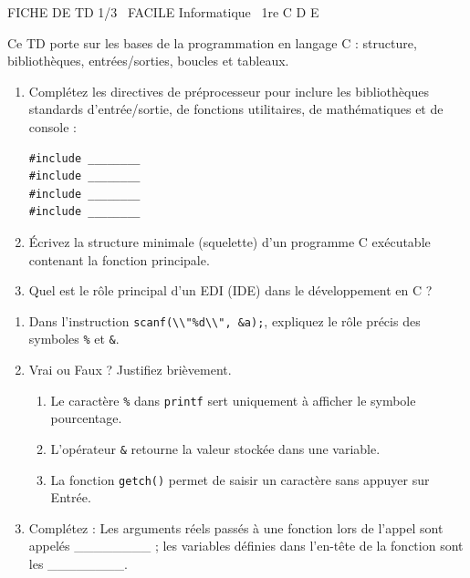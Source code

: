 \documentclass[11pt]{article}
\begin{document}
\begin{tcolorbox}[enhanced,colback=popink,colframe=popink,arc=10pt,boxrule=0pt,left=12pt,right=12pt,top=9pt,bottom=9pt]
{\color{white}\popxbold\small FICHE DE TD 1/3 \textbullet\ FACILE \hfill Informatique \textbullet\ 1re C D E\par}
\end{tcolorbox}
\vspace{4pt}
Ce TD porte sur les bases de la programmation en langage C : structure, bibliothèques, entrées/sorties, boucles et tableaux.

\begin{exercice}
\begin{enumerate}
    \item Complétez les directives de préprocesseur pour inclure les bibliothèques standards d'entrée/sortie, de fonctions utilitaires, de mathématiques et de console :
\begin{verbatim}
#include ________
#include ________
#include ________
#include ________
\end{verbatim}
    \item Écrivez la structure minimale (squelette) d'un programme C exécutable contenant la fonction principale.
    \item Quel est le rôle principal d'un EDI (IDE) dans le développement en C ?
\end{enumerate}
\end{exercice}

\begin{exercice}
\begin{enumerate}
    \item Dans l'instruction \texttt{scanf(\textbackslash{}\textbackslash{}"\%d\textbackslash{}\textbackslash{}", \&a);}, expliquez le rôle précis des symboles \texttt{\%} et \texttt{\&}.
    \item Vrai ou Faux ? Justifiez brièvement.
    \begin{enumerate}
        \item Le caractère \texttt{\%} dans \texttt{printf} sert uniquement à afficher le symbole pourcentage.
        \item L'opérateur \texttt{\&} retourne la valeur stockée dans une variable.
        \item La fonction \texttt{getch()} permet de saisir un caractère sans appuyer sur Entrée.
    \end{enumerate}
    \item Complétez : Les arguments réels passés à une fonction lors de l'appel sont appelés \_\_\_\_\_\_\_\_ ; les variables définies dans l'en-tête de la fonction sont les \_\_\_\_\_\_\_\_.
\end{enumerate}
\end{exercice}
\end{document}
